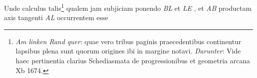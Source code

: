                      \pend 

                     \pstart  Unde calculus talis\footnote{\textit{Am linken Rand quer}:  quae vero tribus paginis praecedentibus continentur lapsibus plena sunt quorum origines ibi in margine notavi. \textit{Darunter}: Vide haec pertinentia clarius Schediasmata de progressionibus et geometria arcana Xb 1674.%
                     }
                      qualem jam subjiciam ponendo  \textit{BL} et \textit{LE}  , et \textit{AB} productam axis tangenti \textit{AL} occurrentem esse 
